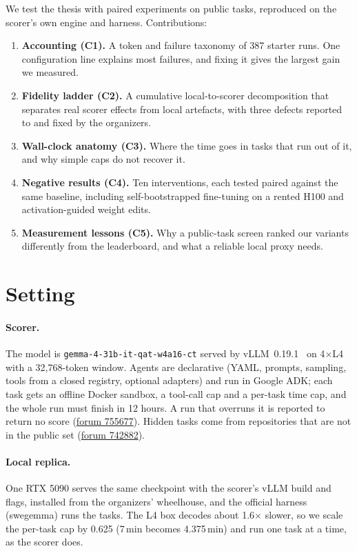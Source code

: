 \documentclass[11pt]{article}
\newcommand{\forum}[1]{\href{https://www.kaggle.com/competitions/gemma-4-developer-agent/discussion/#1}{forum #1}}
\begin{document}
We test the thesis with paired experiments on public tasks, reproduced on the scorer's own engine and harness. Contributions:
\begin{enumerate}
\item \textbf{Accounting (C1).} A token and failure taxonomy of 387 starter runs. One configuration line explains most failures, and fixing it gives the largest gain we measured.
\item \textbf{Fidelity ladder (C2).} A cumulative local-to-scorer decomposition that separates real scorer effects from local artefacts, with three defects reported to and fixed by the organizers.
\item \textbf{Wall-clock anatomy (C3).} Where the time goes in tasks that run out of it, and why simple caps do not recover it.
\item \textbf{Negative results (C4).} Ten interventions, each tested paired against the same baseline, including self-bootstrapped fine-tuning on a rented H100 and activation-guided weight edits.
\item \textbf{Measurement lessons (C5).} Why a public-task screen ranked our variants differently from the leaderboard, and what a reliable local proxy needs.
\end{enumerate}

\section{Setting}
\paragraph{Scorer.} The model is \texttt{gemma-4-31b-it-qat-w4a16-ct} served by vLLM~0.19.1~\citep{kwon2023vllm} on 4$\times$L4 with a 32,768-token window. Agents are declarative (YAML, prompts, sampling, tools from a closed registry, optional adapters) and run in Google ADK; each task gets an offline Docker sandbox, a tool-call cap and a per-task time cap, and the whole run must finish in 12 hours. A run that overruns it is reported to return no score (\forum{755677}). Hidden tasks come from repositories that are not in the public set (\forum{742882}).

\paragraph{Local replica.} One RTX 5090 serves the same checkpoint with the scorer's vLLM build and flags, installed from the organizers' wheelhouse, and the official harness (swegemma) runs the tasks. The L4 box decodes about 1.6$\times$ slower, so we scale the per-task cap by 0.625 (7\,min becomes 4.375\,min) and run one task at a time, as the scorer does.
\end{document}
